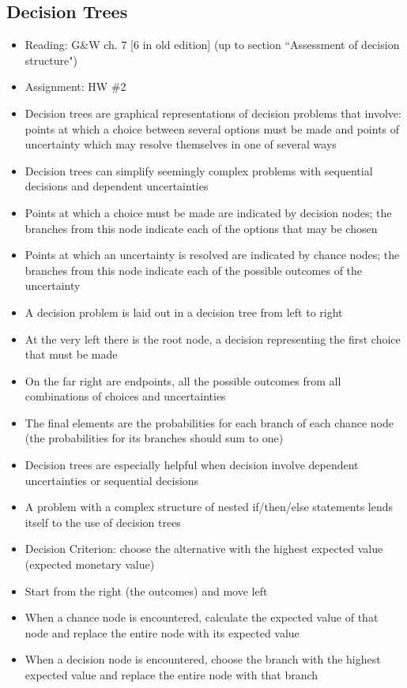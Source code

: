 \documentclass[12pt]{article}
\begin{document}
\subsection{Decision Trees}
\begin{itemize}
\item Reading: G\&W ch. 7 [6 in old edition] (up to section ``Assessment of decision structure")
\item Assignment: HW \#2
\item Decision trees are graphical representations of decision problems that involve: points at which a choice between several options must be made and points of uncertainty which may resolve themselves in one of several ways 
\item Decision trees can simplify seemingly complex problems with sequential decisions and dependent uncertainties
\item Points at which a choice must be made are indicated by decision nodes; the branches from this node indicate each of the options that may be chosen 
\item Points at which an uncertainty is resolved are indicated by chance nodes; the branches from this node indicate each of the possible outcomes of the uncertainty
\item A decision problem is laid out in a decision tree from left to right 
\item At the very left there is the root node, a decision representing the first choice that must be made
\item On the far right are endpoints, all the possible outcomes from all combinations of choices and uncertainties
\item The final elements are the probabilities for each branch of each chance node (the probabilities for its branches should sum to one)
\item Decision trees are especially helpful when decision involve dependent uncertainties or sequential decisions
\item A problem with a complex structure of nested if/then/else statements lends itself to the use of decision trees 
\item Decision Criterion: choose the alternative with the highest expected value (expected monetary value)
\item Start from the right (the outcomes) and move left
\item When a chance node is encountered, calculate the expected value of that node and replace the entire node with its expected value
\item When a decision node is encountered, choose the branch with the highest expected value and replace the entire node with that branch 
\end{itemize}
\end{document}
